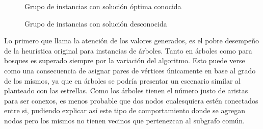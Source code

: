 


\begin{figure}[H]
	\centering
	\caption{Grupo de instancias con solución óptima conocida}
	\pgfplotstabletypeset[
		columns={0, sol, 1, alternative, ratio}
	]{\knowngreedy}
\end{figure}

\begin{figure}[H]
	\centering
	\caption{Grupo de instancias con solución desconocida}
	\pgfplotstabletypeset[
		columns={0, 1, alternative, ratio}
	]{\unknowngreedy}
\end{figure}

Lo primero que llama la atención de los valores generados, es el pobre desempeño
de la heurística original para instancias de árboles. Tanto en árboles como para
bosques es superado siempre por la variación del algoritmo. Esto puede verse
como una consecuencia de asignar pares de vértices únicamente en base al grado
de los mismos, ya que en árboles se podría presentar un escenario similar al
planteado con las estrellas. Como los árboles tienen el número justo de aristas
para ser conexos, es menos probable que dos nodos cualesquiera estén conectados
entre si, pudiendo explicar así este tipo de comportamiento donde se agregan
nodos pero los mismos no tienen vecinos que pertenezcan al subgrafo común.

